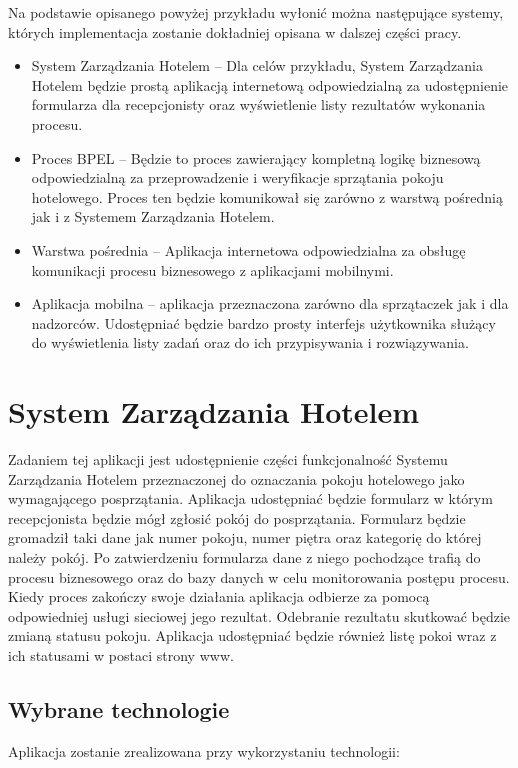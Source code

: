 Na podstawie opisanego powyżej przykładu wyłonić można następujące systemy, których implementacja zostanie dokładniej opisana w dalszej części pracy.

\begin{itemize}
\item System Zarządzania Hotelem -- Dla celów przykładu, System Zarządzania Hotelem będzie prostą aplikacją internetową odpowiedzialną za udostępnienie formularza dla recepcjonisty oraz wyświetlenie listy rezultatów wykonania procesu.   
\item Proces BPEL -- Będzie to proces zawierający kompletną logikę biznesową odpowiedzialną za przeprowadzenie i weryfikacje sprzątania pokoju hotelowego. Proces ten będzie komunikował się zarówno z warstwą pośrednią jak i z Systemem Zarządzania Hotelem. 
\item Warstwa pośrednia --  Aplikacja internetowa odpowiedzialna za obsługę komunikacji procesu biznesowego z aplikacjami mobilnymi. 
\item Aplikacja mobilna -- aplikacja przeznaczona zarówno dla sprzątaczek jak i dla nadzorców. Udostępniać będzie bardzo prosty interfejs użytkownika służący do wyświetlenia listy zadań oraz do ich przypisywania i rozwiązywania. 
\end{itemize}



\section{System Zarządzania Hotelem }
\label{sec:hotelManagementSystem}

Zadaniem tej aplikacji jest udostępnienie części funkcjonalność Systemu Zarządzania Hotelem przeznaczonej do oznaczania pokoju hotelowego jako wymagającego posprzątania. Aplikacja udostępniać będzie formularz w którym recepcjonista będzie mógł zgłosić pokój do posprzątania. Formularz będzie gromadził taki dane jak numer pokoju, numer piętra oraz kategorię do której należy pokój. Po zatwierdzeniu formularza  dane z niego pochodzące trafią do procesu biznesowego oraz do bazy danych w celu monitorowania postępu procesu. Kiedy proces zakończy swoje działania aplikacja odbierze za pomocą odpowiedniej usługi sieciowej jego rezultat. Odebranie rezultatu skutkować będzie zmianą statusu pokoju. Aplikacja udostępniać będzie również listę pokoi wraz z ich statusami w postaci strony www. 

\subsection{Wybrane technologie}
Aplikacja zostanie zrealizowana przy wykorzystaniu technologii:

